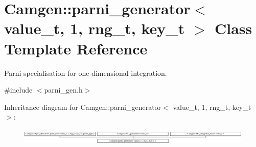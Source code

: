 \hypertarget{a00394}{}\section{Camgen\+:\+:parni\+\_\+generator$<$ value\+\_\+t, 1, rng\+\_\+t, key\+\_\+t $>$ Class Template Reference}
\label{a00394}


Parni specialisation for one-\/dimensional integration.  




{\ttfamily \#include $<$parni\+\_\+gen.\+h$>$}

Inheritance diagram for Camgen\+:\+:parni\+\_\+generator$<$ value\+\_\+t, 1, rng\+\_\+t, key\+\_\+t $>$\+:\begin{figure}[H]
\begin{center}
\leavevmode
\includegraphics[height=0.809834cm]{a00394}
\end{center}
\end{figure}
